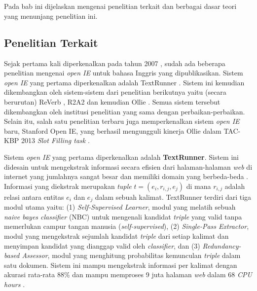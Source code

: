 \chapter{\babDua}
Pada bab ini dijelaskan mengenai penelitian terkait dan berbagai dasar teori yang menunjang penelitian ini.

\section{Penelitian Terkait}

Sejak pertama kali diperkenalkan pada tahun 2007 \citep{banko2007open}, sudah ada beberapa penelitian mengenai \textit{open IE} untuk bahasa Inggris yang dipublikasikan. Sistem \textit{open IE} yang pertama diperkenalkan adalah TextRunner \citep{banko2007open}. Sistem ini kemudian dikembangkan oleh sistem-sistem dari penelitian berikutnya yaitu (secara berurutan) ReVerb \citep{fader2011identifying}, R2A2 \citep{etzioni2011open} dan kemudian Ollie \citep{schmitz2012open}. Semua sistem tersebut dikembangkan oleh institusi penelitian yang sama dengan perbaikan-perbaikan. Selain itu, salah satu penelitian terbaru juga memperkenalkan sistem \textit{open IE} baru, Stanford Open IE, yang berhasil mengungguli kinerja Ollie dalam TAC-KBP 2013 \textit{Slot Filling task} \citep{angeli2015leveraging}.

Sistem \textit{open IE} yang pertama diperkenalkan adalah \textbf{TextRunner}. Sistem ini didesain untuk mengekstrak informasi secara efisien dari halaman-halaman \textit{web} di internet yang jumlahnya sangat besar dan memiliki domain yang berbeda-beda \citep{banko2007open}. Informasi yang diekstrak merupakan \textit{tuple} $t = (e_i, r_{i,j}, e_j)$ di mana $r_{i,j}$ adalah relasi antara entitas $e_i$ dan $e_j$ dalam sebuah kalimat. TextRunner terdiri dari tiga modul utama \citep{banko2007open} yaitu: (1) \textit{Self-Supervised Learner}, modul yang melatih sebuah \textit{naive bayes classifier} (NBC) untuk mengenali kandidat \textit{triple} yang valid tanpa memerlukan campur tangan manusia (\textit{self-supervised}), (2) \textit{Single-Pass Extractor}, modul yang mengekstrak sejumlah kandidat \textit{triple} dari setiap kalimat dan menyimpan kandidat yang dianggap valid oleh \textit{classifier}, dan (3) \textit{Redundancy-based Assessor}, modul yang menghitung probabilitas kemunculan \textit{triple} dalam satu dokumen. Sistem ini mampu mengekstrak informasi per kalimat dengan akurasi rata-rata 88\% dan mampu memproses 9 juta halaman \textit{web} dalam 68 \textit{CPU hours} \citep{banko2007open}.

